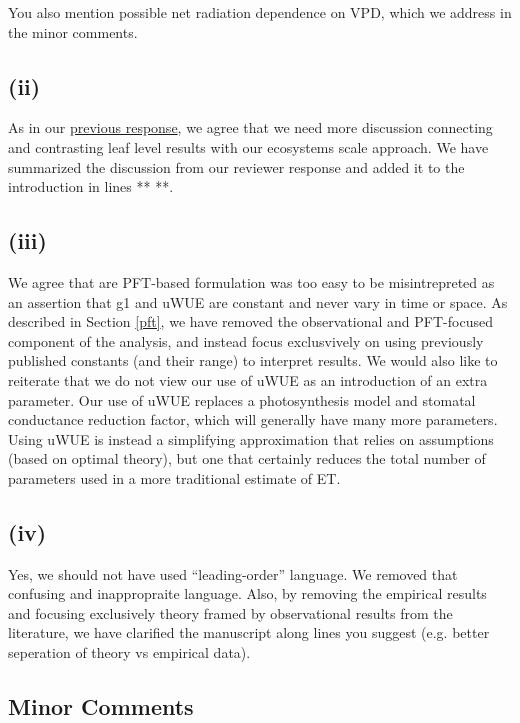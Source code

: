 \documentclass[12pt]{article}
\begin{document}
You also mention possible net radiation dependence on VPD, which we
address in the minor comments.

\subsection{(ii)}
\label{leaf}
As in our
\href{https://www.hydrol-earth-syst-sci-discuss.net/hess-2018-553/hess-2018-553-AC2-supplement.pdf}{previous
  response}, we agree that we need more discussion connecting and
contrasting leaf level results with our ecosystems scale approach. We
have summarized the discussion from our reviewer response and added it
to the introduction in lines ** **.

\subsection{(iii)}

We agree that are PFT-based formulation was too easy to be
misintrepreted as an assertion that g1 and uWUE are constant and never
vary in time or space. As described in Section \ref{pft}, we have
removed the observational and PFT-focused component of the analysis,
and instead focus exclusvively on using previously published constants
(and their range) to interpret results. We would also like to
reiterate that we do not view our use of uWUE as an introduction of an
extra parameter. Our use of uWUE replaces a photosynthesis model and
stomatal conductance reduction factor, which will generally have many
more parameters. Using uWUE is instead a simplifying approximation
that relies on assumptions (based on optimal theory), but one that
certainly reduces the total number of parameters used in a more
traditional estimate of ET.

\subsection{(iv)}

Yes, we should not have used ``leading-order'' language. We removed
that confusing and inappropraite language. Also, by removing the
empirical results and focusing exclusively theory framed by observational
results from the literature, we have clarified the manuscript along
lines you suggest (e.g. better seperation of theory vs empirical
data).

\subsection{Minor Comments}
\end{document}
